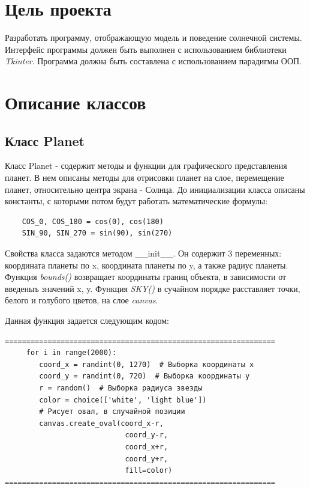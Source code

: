\documentclass[11pt,a4paper]{report}
\begin{document}
\section{Цель проекта}
Разработать программу, отображающую модель и поведение солнечной системы. Интерфейс программы должен быть выполнен с использованием библиотеки \textit{Tkinter}. Программа должна быть составлена с использованием парадигмы ООП.

\section{Описание классов}


\subsection{Класс Planet}

Класс Planet  - содержит методы и функции для графического представления планет. В нем описаны методы для отрисовки планет на слое, перемещение планет, относительно центра экрана - Солнца.
До инициализации класса описаны константы, с которыми потом будут работать математические формулы:
\begin{verbatim}
    COS_0, COS_180 = cos(0), cos(180)
    SIN_90, SIN_270 = sin(90), sin(270)
\end{verbatim}
Свойства класса задаются методом \_\_init\_\_. Он содержит 3 переменных: координата планеты по x, координата планеты по y, а также радиус планеты.
Функция \textit{bounds()} возвращает координаты границ объекта, в зависимости от введеныъ значений x, y.
Функция \textit{SKY()} в сучайном порядке расставляет точки, белого и голубого цветов, на слое \textit{canvas}.

Данная функция задается следующим кодом:
\begin{verbatim}
===============================================================
     for i in range(2000):
        coord_x = randint(0, 1270)  # Выборка координаты x
        coord_y = randint(0, 720)  # Выборка координаты y
        r = random()  # Выборка радиуса звезды
        color = choice(['white', 'light blue'])
        # Рисует овал, в случайной позиции
        canvas.create_oval(coord_x-r,
                            coord_y-r, 
                            coord_x+r,
                            coord_y+r,
                            fill=color)  
===============================================================                
\end{verbatim}
\end{document}
